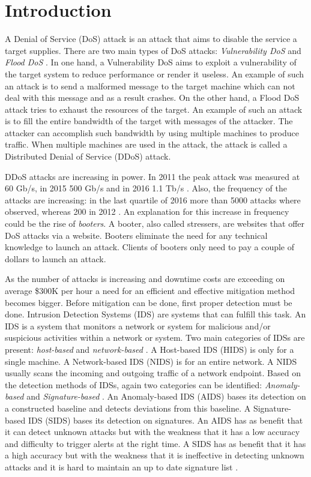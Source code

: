 \section{Introduction} \label{sec:introduction}
A Denial of Service (DoS) attack is an attack that aims to disable the service a target supplies. There are two main types of DoS attacks: \textit{Vulnerability DoS} and \textit{Flood DoS} \cite{Lin2013}. In one hand, a Vulnerability DoS aims to exploit a vulnerability of the target system to reduce performance or render it useless. An example of such an attack is to send a malformed message to the target machine which can not deal with this message and as a result crashes. On the other hand, a Flood DoS attack tries to exhaust the resources of the target. An example of such an attack is to fill the entire bandwidth of the target with messages of the attacker. The attacker can accomplish such bandwidth by using multiple machines to produce traffic. When multiple machines are used in the attack, the attack is called a Distributed Denial of Service (DDoS) attack.  

DDoS attacks are increasing in power. In 2011 the peak attack was measured at 60 Gb/s, in 2015 500 Gb/s and in 2016 1.1 Tb/s \cite{Santana2017}. Also, the frequency of the attacks are increasing: in the last quartile of 2016 more than 5000 attacks where observed, whereas 200 in 2012 \cite{Santana2017}. An explanation for this increase in frequency could be the rise of \textit{booters}. A booter, also called stressers, are websites that offer DoS attacks via a website. Booters eliminate the need for any technical knowledge to launch an attack. Clients of booters only need to pay a couple of dollars to launch an attack.

As the number of attacks is increasing and downtime costs are exceeding on average \$300K per hour \cite{ITIC2016} a need for an efficient and effective mitigation method becomes bigger. Before mitigation can be done, first proper detection must be done. Intrusion Detection Systems (IDS) are systems that can fulfill this task. An IDS is a system that monitors a network or system for malicious and/or suspicious activities within a network or system. Two main categories of IDSs are present: \textit{host-based} and \textit{network-based} \cite{Fallahi2016}. A Host-based IDS (HIDS) is only for a single machine. A Network-based IDS (NIDS) is for an entire network. A NIDS usually scans the incoming and outgoing traffic of a network endpoint. Based on the detection methods of IDSs, again two categories can be identified: \textit{Anomaly-based} and \textit{Signature-based} \cite{fragkiadakis2015anomaly}. An Anomaly-based IDS (AIDS) bases its detection on a constructed baseline and detects deviations from this baseline. A Signature-based IDS (SIDS) bases its detection on signatures. An AIDS has as benefit that it can detect unknown attacks but with the weakness that it has a low accuracy and difficulty to trigger alerts at the right time. A SIDS has as benefit that it has a high accuracy but with the weakness that it is ineffective in detecting unknown attacks and it is hard to maintain an up to date signature list \cite{Liao2013}. 

